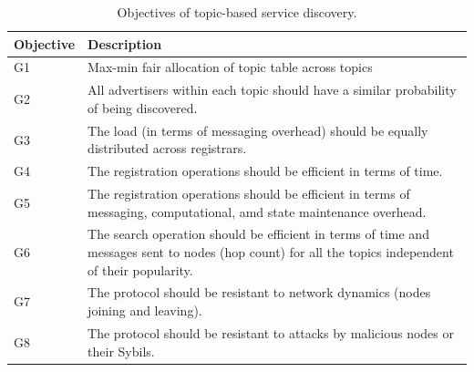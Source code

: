 



\begin{table} 
\caption{Objectives of topic-based service discovery.}
\label{tab:objectives}
\renewcommand{\arraystretch}{1.5}
\renewcommand{\tabcolsep}{0.5em}
\centering
\scriptsize{
\begin{tabular} {p{1cm}p{5cm}}
\toprule
\textbf{Objective} & \textbf{Description} \\
\hline
G1 & Max-min fair allocation of topic table across topics \\
\hline
G2 & All advertisers within each topic should have a similar probability of being discovered. \\
\hline
G3 & The load (in terms of messaging overhead) should be equally distributed across registrars. \\
\hline
G4 & The registration operations should be efficient in terms of time. \\
\hline
G5 & The registration operations should be efficient in terms of messaging, computational, amd state maintenance overhead. \\
\hline 
G6 & The search operation should be efficient in terms of time and messages sent to nodes (hop count) for all the topics independent of their popularity. \\
\hline
G7 & The protocol should be resistant to network dynamics (nodes joining and leaving). \\
\hline 
G8 & The protocol should be resistant to attacks by malicious nodes or their Sybils. \\
\hline
\end{tabular}
}
\vspace{-0.2in}
\end{table}


